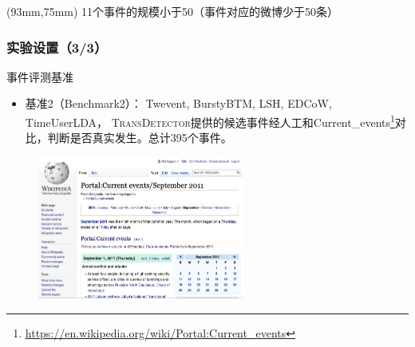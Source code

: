 \begin{frame}
\begin{textblock*}{25mm}(93mm,75mm)
\noindent \tiny{11个事件的规模小于50（事件对应的微博少于50条）}
\end{textblock*}
\end{frame}

\begin{frame}
\frametitle{实验设置（3/3）}
\noindent 事件评测基准
\begin{itemize}
	\item 基准2（Benchmark2）： Twevent, BurstyBTM, LSH, EDCoW, TimeUserLDA， \textsc{TransDetector}提供的候选事件经人工和Current\_events\footnote{\tiny{\url{https://en.wikipedia.org/wiki/Portal:Current_events}}}对比，判断是否真实发生。总计{\color{red}395}个事件。
\end{itemize}
\vspace{-0.15cm}
\begin{figure}
\centering
\includegraphics[height=4.7cm]{img/current_events.jpg}
\end{figure}
\end{frame}


